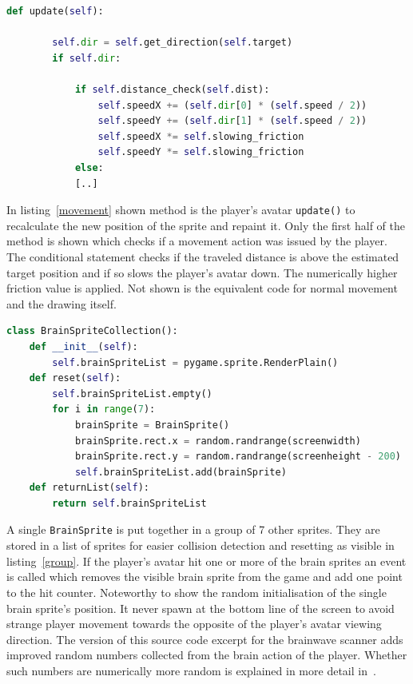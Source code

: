 \documentclass[bibtotocnumbered, headsepline,normalheadings,12pt]{report}
\begin{document}
\begin{lstlisting}[float,language=Python,caption=Player's Avatar Movement,label=movement]
    def update(self):
        
        self.dir = self.get_direction(self.target)
        if self.dir:
            
            if self.distance_check(self.dist):
                self.speedX += (self.dir[0] * (self.speed / 2))
                self.speedY += (self.dir[1] * (self.speed / 2))
                self.speedX *= self.slowing_friction
                self.speedY *= self.slowing_friction
            else:
            [..]
\end{lstlisting}

In listing~\ref{movement} shown method is the player's avatar \texttt{update()} to recalculate the new position of the sprite and repaint it. Only the 
first half of the method is shown which checks if a movement action was issued by the player. The conditional statement checks if 
the traveled distance is above the estimated target position and if so slows the player's avatar down. The numerically higher 
friction value is applied. Not shown is the equivalent code for normal movement and the drawing itself.  

\begin{lstlisting}[float,language=Python,caption=Group of Targets,label=group]
class BrainSpriteCollection():
    def __init__(self):
        self.brainSpriteList = pygame.sprite.RenderPlain()
    def reset(self):
        self.brainSpriteList.empty()
        for i in range(7):
            brainSprite = BrainSprite()
            brainSprite.rect.x = random.randrange(screenwidth)
            brainSprite.rect.y = random.randrange(screenheight - 200)
            self.brainSpriteList.add(brainSprite)
    def returnList(self):
        return self.brainSpriteList
\end{lstlisting}

A single \texttt{BrainSprite} is put together in a group of 7 other sprites. They are stored in a list of sprites for 
easier collision detection and resetting as visible in listing~\ref{group}. If the player's avatar hit one or more of the brain sprites an event is 
called which removes the visible brain sprite from the game and add one point to the hit counter.
Noteworthy to show the random initialisation of the single brain sprite's position. It never spawn at the bottom line of the
screen to avoid strange player movement towards the opposite of the player's avatar viewing direction.
The version of this source code excerpt for the brainwave scanner adds improved random numbers collected from the
brain action of the player. Whether such numbers are numerically more random is explained in more detail in~\cite{pm}.
\end{document}
